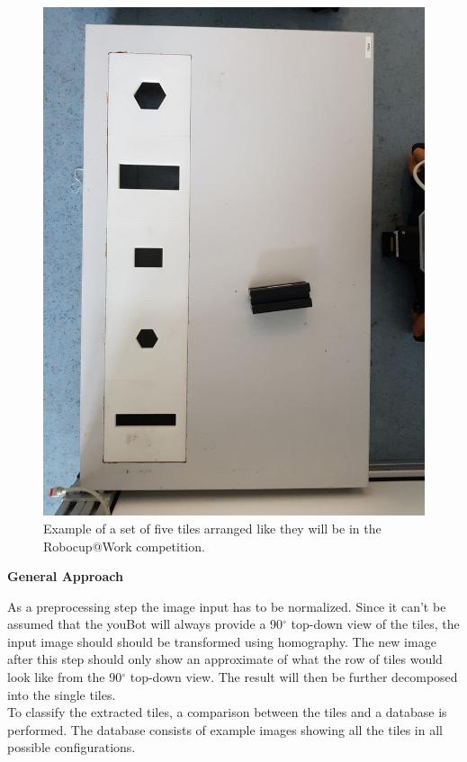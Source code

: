 \documentclass{article}
\begin{document}
\begin{figure}[h!]
\centering
\includegraphics[scale=0.15,angle=270]{images/5tiles.jpeg}
\caption{Example of a set of five tiles arranged like they will be in the Robocup@Work competition.}
\label{fig:row}
\end{figure}

\textbf{General Approach}

As a preprocessing step the image input has to be normalized. Since it can't be assumed that the youBot will always provide a 90$^\circ$ top-down view of the tiles, the input image should should be transformed using homography. The new image after this step should only show an approximate of what the row of tiles would look like from the 90$^\circ$ top-down view. The result will then be further decomposed into the single tiles.\\
To classify the extracted tiles, a comparison between the tiles and a database is performed. The database consists of example images showing all the tiles in all possible configurations.\\
\end{document}
